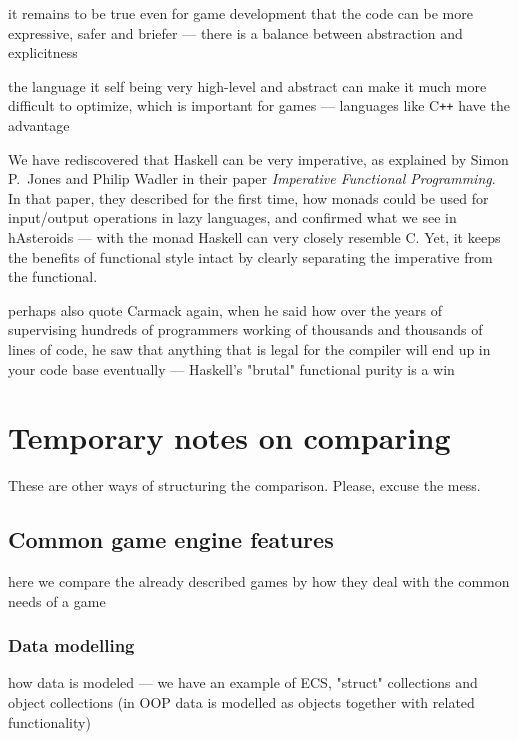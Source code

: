 \documentclass[
  digital, %
  color,   %
  table,   %
  oneside, %
  lof,     %
  lot,     %
]{fithesis3}
\newcommand{\cpp}{C\nolinebreak\texttt{+}\nolinebreak\texttt{+}}
\begin{document}
{it remains to be true even for game development that the code can be more expressive,
safer and briefer --- there is a balance between abstraction and explicitness

the language it self being very high-level and abstract can make it much more
difficult to optimize, which is important for games --- languages like \cpp{} have the advantage

We have rediscovered that Haskell can be very imperative, as explained by Simon P.~Jones and
Philip Wadler in their paper \textit{Imperative Functional Programming}.\cite{imperativefp}
In that paper, they described for the first time, how monads could be used for input/output operations
in lazy languages, and confirmed what we see in hAsteroids ---  with the  monad
Haskell can very closely resemble C. Yet, it keeps the benefits of functional style intact by
clearly separating the imperative from the functional.

perhaps also quote Carmack again, when he said how over the years of supervising
hundreds of programmers working of thousands and thousands of lines of code, he saw that
anything that is legal for the compiler will end up in your code base eventually
--- Haskell's "brutal" functional purity is a win



\chapter*{Temporary notes on comparing}

These are other ways of structuring the comparison. Please, excuse the mess.

\section{Common game engine features}
here we compare the already described games by how they
deal with the common needs of a game

\subsection{Data modelling}
how data is modeled --- we have an example of ECS, "struct" collections
and object collections (in OOP data is modelled as objects together with related functionality)

}
\end{document}
